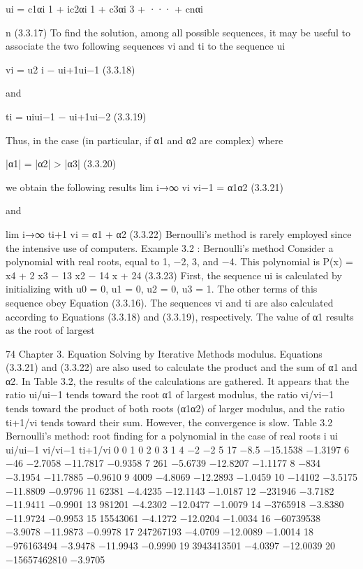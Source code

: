 \documentclass[letterpaper,12pt]{article}
\begin{document}
ui = c1αi
1 + ic2αi
1 + c3αi
3 + ··· + cnαi

n (3.3.17)
To find the solution, among all possible sequences, it may be useful to associate the
two following sequences {vi } and {ti } to the sequence {ui }

vi = u2
i − ui+1ui−1 (3.3.18)

and

ti = uiui−1 − ui+1ui−2 (3.3.19)

Thus, in the case (in particular, if α1 and α2 are complex) where

|α1| = |α2| > |α3| (3.3.20)

we obtain the following results
lim
i→∞
vi
vi−1
= α1α2 (3.3.21)

and

lim
i→∞
ti+1
vi
= α1 + α2 (3.3.22)
Bernoulli’s method is rarely employed since the intensive use of computers.
Example 3.2 :
Bernoulli’s method
Consider a polynomial with real roots, equal to 1, −2, 3, and −4. This polynomial is
P(x) = x4 + 2 x3 − 13 x2 − 14 x + 24 (3.3.23)
First, the sequence {ui } is calculated by initializing with u0 = 0, u1 = 0, u2 = 0, u3 = 1. The
other terms of this sequence obey Equation (3.3.16). The sequences {vi } and {ti } are also calculated
according to Equations (3.3.18) and (3.3.19), respectively. The value of α1 results as the root of largest

74 Chapter 3. Equation Solving by Iterative Methods
modulus. Equations (3.3.21) and (3.3.22) are also used to calculate the product and the sum of α1 and
α2.
In Table 3.2, the results of the calculations are gathered. It appears that the ratio ui/ui−1 tends
toward the root α1 of largest modulus, the ratio vi/vi−1 tends toward the product of both roots (α1α2)
of larger modulus, and the ratio ti+1/vi tends toward their sum. However, the convergence is slow.
Table 3.2 Bernoulli’s method: root finding for a polynomial in the case of real roots
i ui ui/ui−1 vi/vi−1 ti+1/vi
0 0
1 0
2 0
3 1
4 −2 −2
5 17 −8.5 −15.1538 −1.3197
6 −46 −2.7058 −11.7817 −0.9358
7 261 −5.6739 −12.8207 −1.1177
8 −834 −3.1954 −11.7885 −0.9610
9 4009 −4.8069 −12.2893 −1.0459
10 −14102 −3.5175 −11.8809 −0.9796
11 62381 −4.4235 −12.1143 −1.0187
12 −231946 −3.7182 −11.9411 −0.9901
13 981201 −4.2302 −12.0477 −1.0079
14 −3765918 −3.8380 −11.9724 −0.9953
15 15543061 −4.1272 −12.0204 −1.0034
16 −60739538 −3.9078 −11.9873 −0.9978
17 247267193 −4.0709 −12.0089 −1.0014
18 −976163494 −3.9478 −11.9943 −0.9990
19 3943413501 −4.0397 −12.0039
20 −15657462810 −3.9705
\end{document}
